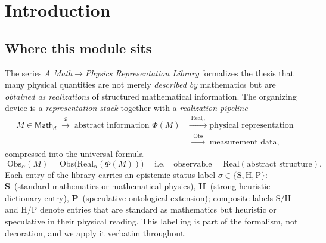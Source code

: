 \documentclass[12pt]{article}
\theoremstyle{definition}
\theoremstyle{remark}
\newcommand{\Math}{\mathsf{Math}}
\newcommand{\Real}{\mathrm{Real}}
\newcommand{\Obs}{\mathrm{Obs}}
\begin{document}
\tableofcontents

\section{Introduction}
\label{sec:intro}

\subsection{Where this module sits}

The series \emph{A Math$\to$Physics Representation Library} formalizes the thesis
that many physical quantities are not merely \emph{described by} mathematics but
are \emph{obtained as realizations} of structured mathematical information. The
organizing device is a \emph{representation stack} together with a
\emph{realization pipeline}
\begin{equation}
\label{eq:pipeline}
\begin{aligned}
M\in\Math_d \;\xrightarrow{\;\Phi\;}\; \text{abstract information }\Phi(M)
\;&\xrightarrow{\;\Real_\alpha\;}\; \text{physical representation}\\
&\xrightarrow{\;\Obs\;}\; \text{measurement data},
\end{aligned}
\end{equation}
compressed into the universal formula
\begin{equation}
\label{eq:master}
\boxed{\;\Obs_\alpha(M)=\Obs\bigl(\Real_\alpha(\Phi(M))\bigr)\;}
\quad\text{i.e.}\quad
\text{observable}=\Real(\text{abstract structure}).
\end{equation}
Each entry of the library carries an epistemic status label
$\sigma\in\{\mathrm{S},\mathrm{H},\mathrm{P}\}$: \textbf{S}~(standard
mathematics or mathematical physics), \textbf{H}~(strong heuristic dictionary
entry), \textbf{P}~(speculative ontological extension); composite labels
$\mathrm{S/H}$ and $\mathrm{H/P}$ denote entries that are standard as
mathematics but heuristic or speculative in their physical reading. This
labelling is part of the formalism, not decoration, and we apply it verbatim
throughout.
\end{document}
